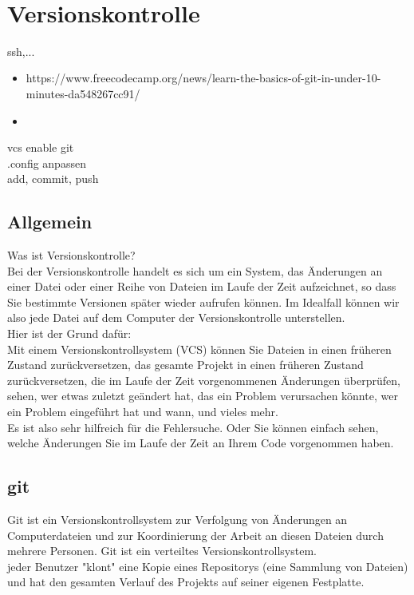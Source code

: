\newpage~\\
\section{Versionskontrolle}
ssh,...
\begin{itemize}
	\item https://www.freecodecamp.org/news/learn-the-basics-of-git-in-under-10-minutes-da548267cc91/
	\item
\end{itemize}


vcs enable git\\
.config anpassen\\
add, commit, push
\subsection{Allgemein}
Was ist Versionskontrolle?\\


Bei der Versionskontrolle handelt es sich um ein System, das Änderungen an einer Datei oder einer Reihe von Dateien im Laufe der Zeit aufzeichnet, so dass Sie bestimmte Versionen später wieder aufrufen können. Im Idealfall können wir also jede Datei auf dem Computer der Versionskontrolle unterstellen.\\


Hier ist der Grund dafür:\\


Mit einem Versionskontrollsystem (VCS) können Sie Dateien in einen früheren Zustand zurückversetzen, das gesamte Projekt in einen früheren Zustand zurückversetzen, die im Laufe der Zeit vorgenommenen Änderungen überprüfen, sehen, wer etwas zuletzt geändert hat, das ein Problem verursachen könnte, wer ein Problem eingeführt hat und wann, und vieles mehr.\\


Es ist also sehr hilfreich für die Fehlersuche. Oder Sie können einfach sehen, welche Änderungen Sie im Laufe der Zeit an Ihrem Code vorgenommen haben.
\subsection{git}
Git ist ein Versionskontrollsystem zur Verfolgung von Änderungen an Computerdateien und zur Koordinierung der Arbeit an diesen Dateien durch mehrere Personen. Git ist ein verteiltes Versionskontrollsystem. \\


 jeder Benutzer "klont" eine Kopie eines Repositorys (eine Sammlung von Dateien) und hat den gesamten Verlauf des Projekts auf seiner eigenen Festplatte.\\



